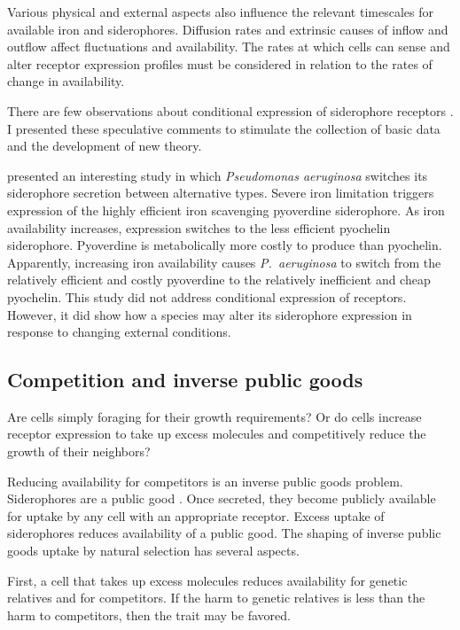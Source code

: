 \documentclass[\mydocfontsize]{article}
\begin{document}
\begin{multicols}{2}
Various physical and external aspects also influence the relevant timescales for available iron and siderophores. Diffusion rates and extrinsic causes of inflow and outflow affect fluctuations and availability. The rates at which cells can sense and alter receptor expression profiles must be considered in relation to the rates of change in availability.

There are few observations about conditional expression of siderophore receptors \autocite{sexton17pseudomonas}. I presented these speculative comments to stimulate the collection of basic data and the development of new theory.

\textcite{dumas13switching} presented an interesting study in which \textit{Pseudomonas aeruginosa} switches its siderophore secretion between alternative types. Severe iron limitation triggers expression of the highly efficient iron scavenging pyoverdine siderophore. As iron availability increases, expression switches to the less efficient pyochelin siderophore. Pyoverdine is metabolically more costly to produce than pyochelin. Apparently, increasing iron availability causes \textit{P.\ aeruginosa} to switch from the relatively efficient and costly pyoverdine to the relatively inefficient and cheap pyochelin. This study did not address conditional expression of receptors. However, it did show how a species may alter its siderophore expression in response to changing external conditions. 

\subsection{Competition and inverse public goods}

Are cells simply foraging for their growth requirements? Or do cells increase receptor expression to take up excess molecules and competitively reduce the growth of their neighbors?

Reducing availability for competitors is an inverse public goods problem. Siderophores are a public good \autocite{west07the-social}. Once secreted, they become publicly available for uptake by any cell with an appropriate receptor. Excess uptake of siderophores reduces availability of a public good. The shaping of inverse public goods uptake by natural selection has several aspects. 

First, a cell that takes up excess molecules reduces availability for genetic relatives and for competitors. If the harm to genetic relatives is less than the harm to competitors, then the trait may be favored.


\end{multicols}
\end{document}
